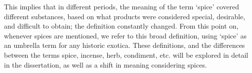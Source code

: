 This implies that in different periods, the meaning of the term `spice' covered different substances, based on what products were considered special, desirable, and difficult to obtain; the definition constantly changed. From this point on, whenever spices are mentioned, we refer to this broad definition, using `spice' as an umbrella term for any historic exotica. These definitions, and the differences between the terms spice, incense, herb, condiment, etc. will be explored in detail in the dissertation, as well as a shift in meaning considering spices.



